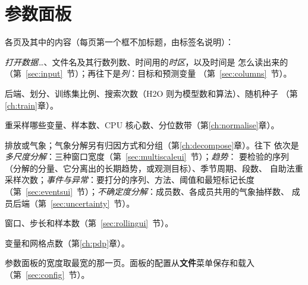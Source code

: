 \documentclass[11pt]{ctexrep}
\newcommand{\nosep}{\setlength{\itemsep}{0pt}\setlength{\parskip}{0pt}\setlength{\topsep}{2pt}}
\newcommand{\tab}[1]{\textbf{#1}}
\begin{document}
\section{参数面板}
各页及其中的内容（每页第一个框不加标题，由标签名说明）：
\begin{description}\nosep
  \item[数据] \emph{打开数据…}、文件名及其行数列数、时间用的\emph{时区}，以及时间是
        怎么读出来的（第~\ref{sec:input}~节）；再往下是\emph{列}：目标和预测变量
        （第~\ref{sec:columns}~节）。
  \item[模型] 后端、划分、训练集比例、搜索次数（H2O 则为模型数和算法）、随机种子
        （第\ref{ch:train}章）。
  \item[归一化] 重采样哪些变量、样本数、CPU 核心数、分位数带（第\ref{ch:normalise}章）。
  \item[分解] 排放或气象；气象分解另有归因方式和分组（第\ref{ch:decompose}章）。往下
        依次是\emph{多尺度分解}：三种窗口宽度（第~\ref{sec:multiscaleui}~节）；\emph{趋势}：
        要检验的序列（分解的分量、它分离出的长期趋势，或观测目标）、季节周期、段数、
        自助法重采样次数；\emph{事件与异常}：要打分的序列、方法、阈值和最短标记长度
        （第~\ref{sec:eventsui}~节）；\emph{不确定度分解}：成员数、各成员共用的气象抽样数、
        成员后端（第~\ref{sec:uncertainty}~节）。
  \item[滚动] 窗口、步长和样本数（第~\ref{sec:rollingui}~节）。
  \item[PDP] 变量和网格点数（第\ref{ch:pdp}章）。
\end{description}
参数面板的宽度取最宽的那一页。面板的配置从\tab{文件}菜单保存和载入
（第~\ref{sec:config}~节）。
\end{document}
